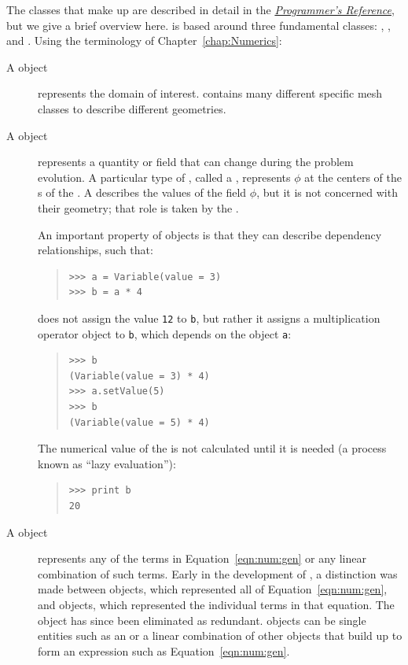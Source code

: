 The \Python{} classes that make up \FiPy{} are described in detail in
the \href{file:reference.pdf}{\textit{\FiPy{} Programmer's
Reference}}, but we give a brief overview here.  \FiPy{} is based
around three fundamental \Python{} classes: ,
, and .  Using the terminology of
Chapter~\ref{chap:Numerics}:
\begin{description}
    \item[A  object] represents the domain of interest.
    \FiPy{} contains many different specific mesh classes to describe
    different geometries.

    \item[A  object] represents a quantity or field
    that can change during the problem evolution.  A particular type
    of , called a , represents \(
    \phi \) at the centers of the s of the .
    A  describes the values of the field \( \phi
    \), but it is not concerned with their geometry; that role is
    taken by the .

    An important property of  objects is that they can
    describe dependency relationships, such that:    
\begin{quote}
\begin{verbatim}
>>> a = Variable(value = 3)
>>> b = a * 4
\end{verbatim}
\end{quote}
    does not assign the value \verb|12| to \verb|b|, but rather it
    assigns a multiplication operator object to \verb|b|, which
    depends on the  object \verb|a|:
\begin{quote}
\begin{verbatim}
>>> b
(Variable(value = 3) * 4)
>>> a.setValue(5)
>>> b
(Variable(value = 5) * 4)
\end{verbatim}
\end{quote}
    The numerical value of the  is not calculated
    until it is needed (a process known as ``lazy evaluation''):
\begin{quote}
\begin{verbatim}
>>> print b
20
\end{verbatim}
\end{quote}

    \item[A  object] represents any of the terms in
    Equation~\eqref{eqn:num:gen} or any linear combination of such
    terms.  Early in the development of \FiPy{}, a distinction was
    made between  objects, which represented all of
    Equation~\eqref{eqn:num:gen}, and  objects, which
    represented the individual terms in that equation.  The
     object has since been eliminated as redundant.
     objects can be single entities such as an
     or a linear combination of other
     objects that build up to form an expression such as
    Equation~\eqref{eqn:num:gen}.
    

\end{description}
